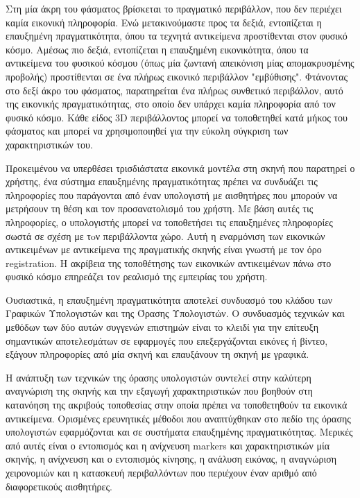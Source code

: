Στη μία άκρη του φάσματος βρίσκεται το πραγματικό περιβάλλον, που δεν περιέχει καμία εικονική πληροφορία. Ενώ μετακινούμαστε προς τα δεξιά, εντοπίζεται η επαυξημένη πραγματικότητα, όπου τα τεχνητά αντικείμενα προστίθενται στον φυσικό κόσμο. Αμέσως πιο δεξιά, εντοπίζεται η επαυξημένη εικονικότητα, όπου τα αντικείμενα του φυσικού κόσμου (όπως μία ζωντανή απεικόνιση μίας απομακρυσμένης προβολής) προστίθενται σε ένα πλήρως εικονικό περιβάλλον "εμβύθισης". Φτάνοντας στο δεξί άκρο του φάσματος, παρατηρείται ένα πλήρως συνθετικό περιβάλλον, αυτό της εικονικής πραγματικότητας, στο οποίο δεν υπάρχει καμία πληροφορία από τον φυσικό κόσμο. Κάθε είδος 3D περιβάλλοντος μπορεί να τοποθετηθεί κατά μήκος του φάσματος και μπορεί να χρησιμοποιηθεί για την εύκολη σύγκριση των χαρακτηριστικών του.



Προκειμένου να υπερθέσει τρισδιάστατα εικονικά μοντέλα στη σκηνή που παρατηρεί ο χρήστης, ένα σύστημα επαυξημένης πραγματικότητας πρέπει να συνδυάζει τις πληροφορίες που παράγονται από έναν υπολογιστή με αισθητήρες που μπορούν να μετρήσουν τη θέση και τον προσανατολισμό του χρήστη. Με βάση αυτές τις πληροφορίες, ο υπολογιστής μπορεί να τοποθετήσει τις επαυξημένες πληροφορίες σωστά σε σχέση με τoν περιβάλλοντα χώρο. Αυτή η εναρμόνιση των εικονικών αντικειμένων με αντικείμενα της πραγματικής σκηνής είναι γνωστή με τον όρο registration. Η ακρίβεια της τοποθέτησης των εικονικών αντικειμένων πάνω στο φυσικό κόσμο επηρεάζει τον ρεαλισμό της εμπειρίας του χρήστη. 


Ουσιαστικά, η επαυξημένη πραγματικότητα αποτελεί συνδυασμό του κλάδου των Γραφικών Υπολογιστών και της Όρασης Υπολογιστών. Ο συνδυασμός τεχνικών και μεθόδων των δύο αυτών συγγενών επιστημών είναι το κλειδί για την επίτευξη σημαντικών αποτελεσμάτων σε εφαρμογές που επεξεργάζονται εικόνες ή βίντεο, εξάγουν πληροφορίες από μία σκηνή και επαυξάνουν τη σκηνή με γραφικά.


Η ανάπτυξη των τεχνικών της όρασης υπολογιστών συντελεί στην καλύτερη αναγνώριση της σκηνής και την εξαγωγή χαρακτηριστικών που βοηθούν στη κατανόηση της ακριβούς τοποθεσίας στην οποία πρέπει να τοποθετηθούν τα εικονικά αντικείμενα. Ορισμένες ερευνητικές μέθοδοι που αναπτύχθηκαν στο πεδίο της όρασης υπολογιστών εφαρμόζονται και σε συστήματα επαυξημένης πραγματικότητας. Μερικές από αυτές είναι ο εντοπισμός και η ανίχνευση markers και χαρακτηριστικών μία σκηνής, η ανίχνευση και ο εντοπισμός κίνησης, η ανάλυση εικόνας, η αναγνώριση χειρονομιών και η κατασκευή περιβαλλόντων που περιέχουν έναν αριθμό από διαφορετικούς αισθητήρες.


